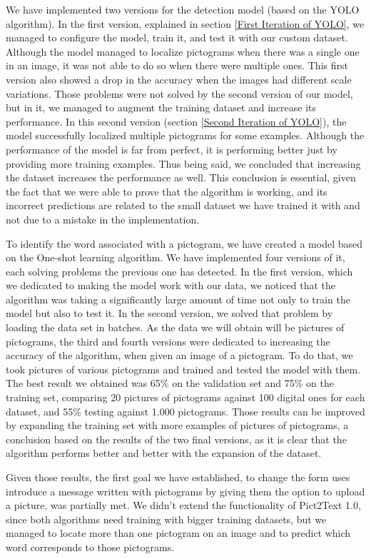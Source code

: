 We have implemented two versions for the detection model (based on the YOLO algorithm). In the first version, explained in section \ref{First Iteration of YOLO}, we managed to configure the model, train it, and test it with our custom dataset. Although the model managed to localize pictograms when there was a single one in an image, it was not able to do so when there were multiple ones. This first version also showed a drop in the accuracy when the images had different scale variations. Those problems were not solved by the second version of our model, but in it, we managed to augment the training dataset and increase its performance. In this second version (section \ref{Second Iteration of YOLO}), the model successfully localized multiple pictograms for some examples. Although the performance of the model is far from perfect, it is performing better just by providing more training examples. Thus being said, we concluded that increasing the dataset increases the performance as well. This conclusion is essential, given the fact that we were able to prove that the algorithm is working, and its incorrect predictions are related to the small dataset we have trained it with and not due to a mistake in the implementation.

To identify the word associated with a pictogram, we have created a model based on the One-shot learning algorithm. We have implemented four versions of it, each solving problems the previous one has detected. In the first version, which we dedicated to making the model work with our data, we noticed that the algorithm was taking a significantly large amount of time not only to train the model but also to test it. In the second version, we solved that problem by loading the data set in batches. As the data we will obtain will be pictures of pictograms, the third and fourth versions were dedicated to increasing the accuracy of the algorithm, when given an image of a pictogram. To do that, we took pictures of various pictograms and trained and tested the model with them. The best result we obtained was 65\% on the validation set and 75\% on the training set, comparing 20 pictures of pictograms against 100 digital ones for each dataset, and 55\% testing against 1.000 pictograms. Those results can be improved by expanding the training set with more examples of pictures of pictograms, a conclusion based on the results of the two final versions, as it is clear that the algorithm performs better and better with the expansion of the dataset.

Given those results, the first goal we have established, to change the form uses introduce a message written with pictograms by giving them the option to upload a picture, was partially met. We didn't extend the functionality of Pict2Text 1.0, since both algorithms need training with bigger training datasets, but we managed to locate more than one pictogram on an image and to predict which word corresponds to those pictograms. 

